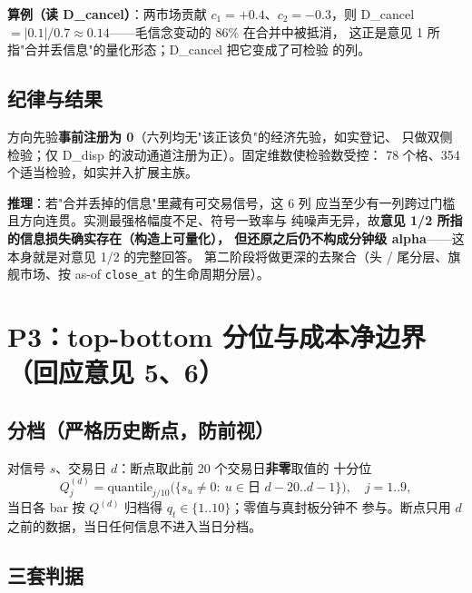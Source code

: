 \documentclass[11pt, a4paper]{ctexart}
\newcommand{\code}[1]{\texttt{\small #1}}
\begin{document}
\textbf{算例（读 D\_cancel）}：两市场贡献 $c_1=+0.4$、$c_2=-0.3$，则
D\_cancel $=|0.1|/0.7\approx0.14$——毛信念变动的 86\% 在合并中被抵消，
这正是意见 1 所指"合并丢信息"的量化形态；D\_cancel 把它变成了可检验
的列。

\subsection{纪律与结果}

方向先验\textbf{事前注册为 0}（六列均无"该正该负"的经济先验，如实登记、
只做双侧检验；仅 D\_disp 的波动通道注册为正）。固定维数使检验数受控：
78 个格、354 个适当检验，如实并入扩展主族。

\begin{table}[h!]\centering\small
\caption{分散度矩族 $|t|$ 前 8 格。\textbf{两个一致率口径勿混}：表内
列为\emph{该格六视界内}的符号一致率；正文引用的 58\% 则是
D\_hhi\_metal\_price \emph{信号跨品种}（AU/AG）$\times$6 视界共 12 个
IC 的一致率（纯噪声期望约 57\%）。极值格 $|t|=3.994<4.285$：幅度不足，
且信号层面方向不连贯}

\end{table}

\noindent\textbf{推理}：若"合并丢掉的信息"里藏有可交易信号，这 6 列
应当至少有一列跨过门槛且方向连贯。实测最强格幅度不足、符号一致率与
纯噪声无异，故\textbf{意见 1/2 所指的信息损失确实存在（构造上可量化），
但还原之后仍不构成分钟级 alpha}——这本身就是对意见 1/2 的完整回答。
第二阶段将做更深的去聚合（头 / 尾分层、旗舰市场、按 as-of
\code{close\_at} 的生命周期分层）。

\section{P3：top-bottom 分位与成本净边界（回应意见 5、6）}\label{sec:p3}

\subsection{分档（严格历史断点，防前视）}

对信号 $s$、交易日 $d$：断点取此前 20 个交易日\textbf{非零}取值的
十分位
\[
Q^{(d)}_{j} = \mathrm{quantile}_{j/10}
\big(\{s_u \ne 0:\ u\in \text{日 } d{-}20..d{-}1\}\big),
\quad j=1..9,
\]
当日各 bar 按 $Q^{(d)}$ 归档得 $q_t\in\{1..10\}$；零值与真封板分钟不
参与。断点只用 $d$ 之前的数据，当日任何信息不进入当日分档。

\subsection{三套判据}
\end{document}
